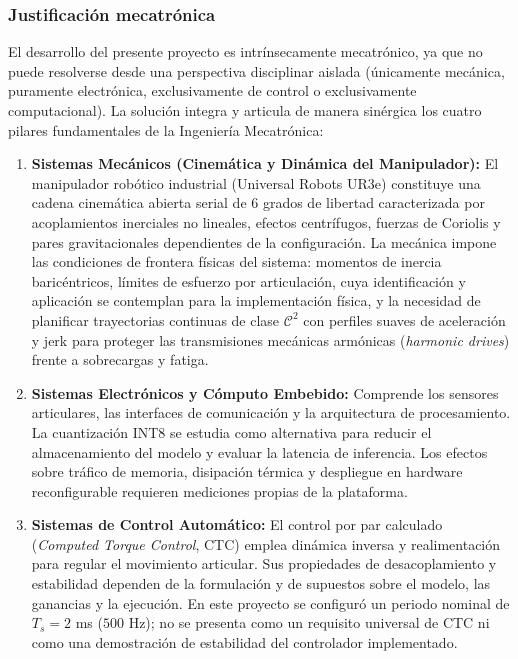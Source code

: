 \documentclass[12pt]{article}
\begin{document}
\subsubsection*{Justificación mecatrónica}
El desarrollo del presente proyecto es intrínsecamente mecatrónico, ya que no puede resolverse desde una perspectiva disciplinar aislada (únicamente mecánica, puramente electrónica, exclusivamente de control o exclusivamente computacional). La solución integra y articula de manera sinérgica los cuatro pilares fundamentales de la Ingeniería Mecatrónica:
\begin{enumerate}[label=\textbf{\arabic*.}]
    \item \textbf{Sistemas Mecánicos (Cinemática y Dinámica del Manipulador):}
    El manipulador robótico industrial (Universal Robots UR3e) constituye una cadena cinemática abierta serial de 6 grados de libertad caracterizada por acoplamientos inerciales no lineales, efectos centrífugos, fuerzas de Coriolis y pares gravitacionales dependientes de la configuración. La mecánica impone las condiciones de frontera físicas del sistema: momentos de inercia baricéntricos, límites de esfuerzo por articulación, cuya identificación y aplicación se contemplan para la implementación física, y la necesidad de planificar trayectorias continuas de clase $\mathcal{C}^2$ con perfiles suaves de aceleración y jerk para proteger las transmisiones mecánicas armónicas (\textit{harmonic drives}) frente a sobrecargas y fatiga.
    
    \item \textbf{Sistemas Electrónicos y Cómputo Embebido:}
    Comprende los sensores articulares, las interfaces de comunicación y la arquitectura de procesamiento. La cuantización INT8 se estudia como alternativa para reducir el almacenamiento del modelo y evaluar la latencia de inferencia. Los efectos sobre tráfico de memoria, disipación térmica y despliegue en hardware reconfigurable requieren mediciones propias de la plataforma.
    
    \item \textbf{Sistemas de Control Automático:}
    El control por par calculado (\textit{Computed Torque Control}, CTC) emplea dinámica inversa y realimentación para regular el movimiento articular. Sus propiedades de desacoplamiento y estabilidad dependen de la formulación y de supuestos sobre el modelo, las ganancias y la ejecución. En este proyecto se configuró un periodo nominal de $T_s=2$ ms ($500$ Hz); no se presenta como un requisito universal de CTC ni como una demostración de estabilidad del controlador implementado.
    

\end{enumerate}
\end{document}

